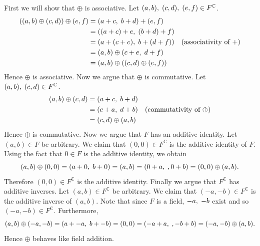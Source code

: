 \documentclass[12pt]{article}
\newcommand{\C}{\mathbb{C}}
\newcommand{\ttc}{, \hspace{1mm}}
\theoremstyle{plain}
\theoremstyle{definition}
\begin{document}
First we will show that $\oplus$ is associative. Let $(a,b)\ttc(c,d)\ttc(e,f)\in F^\C$.
\begin{align*}
	((a,b)\oplus(c,d))\oplus(e,f) & = (a + c\ttc b + d) + (e,f)\\
	& = ((a + c) + e\ttc (b + d) + f)\\
	& = (a + (c + e)\ttc b + (d + f)) & \text{(associativity of $+$)}\\
	& = (a,b) \oplus (c + e\ttc d + f)\\
	& = (a,b)\oplus ((c,d) \oplus (e,f))
\end{align*}
Hence $\oplus$ is associative. Now we argue that $\oplus$ is commutative. Let $(a,b)\ttc(c,d)\in F^\C$.
\begin{align*}
	(a,b)\oplus (c,d) & = (a + c\ttc b + d)\\
	& = (c + a\ttc d + b) & \text{(commutativity of $\oplus$)}\\
	& = (c,d)\oplus (a,b)
\end{align*}
Hence $\oplus$ is commutative. Now we argue that $F$ has an additive identity. Let $(a,b)\in F$ be arbitrary. We claim that $(0,0)\in F^\C$ is the additive identity of $F$. Using the fact that $0\in F$ is the additive identity, we obtain
	\[
		(a,b)\oplus (0,0) = (a + 0\ttc b + 0) = (a,b) = (0 + a\ttc, 0 + b) = (0,0) \oplus (a,b).
	\]
Therefore $(0,0)\in F^\C$ is the additive identity. Finally we argue that $F^\C$ has additive inverses. Let $(a,b)\in F^\C$ be arbitrary. We claim that $(-a,-b)\in F^\C$ is the additive inverse of $(a,b)$. Note that since $F$ is a field, $-a\ttc -b$ exist and so $(-a,-b)\in F^\C$. Furthermore,
	\[
		(a,b)\oplus (-a,-b) = (a + -a\ttc b + -b) = (0,0) = (-a + a\ttc, -b + b) = (-a,-b) \oplus (a,b).
	\]
Hence $\oplus$ behaves like field addition. 
\end{document}
